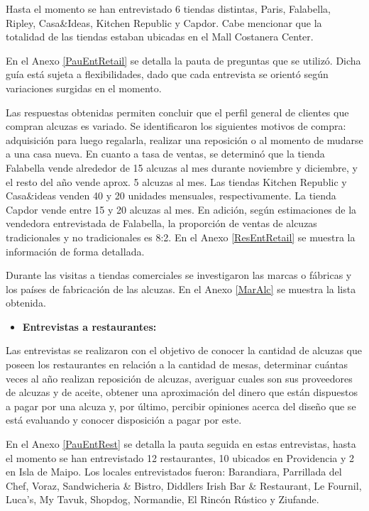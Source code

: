 Hasta el momento se han entrevistado 6 tiendas distintas, Paris, Falabella, Ripley, Casa\&Ideas, Kitchen Republic y Capdor. Cabe mencionar que la totalidad de las tiendas estaban ubicadas en el Mall Costanera Center.

En el Anexo \ref{PauEntRetail} se detalla la pauta de preguntas que se utilizó. Dicha guía está sujeta a flexibilidades, dado que cada entrevista se orientó según variaciones surgidas en el momento.

Las respuestas obtenidas permiten concluir que el perfil general de clientes que compran alcuzas es variado. Se identificaron los siguientes motivos de compra: adquisición para luego regalarla, realizar una reposición o al momento de mudarse a una casa nueva. En cuanto a tasa de ventas, se determinó que la tienda Falabella vende alrededor de 15 alcuzas al mes durante noviembre y diciembre, y el resto del año vende aprox. 5 alcuzas al mes. Las tiendas Kitchen Republic y Casa\&ideas venden 40 y 20 unidades mensuales, respectivamente.  La tienda Capdor vende entre 15 y 20 alcuzas al mes. En adición, según estimaciones de la vendedora entrevistada de Falabella, la proporción de ventas de alcuzas tradicionales y no tradicionales es 8:2. En el Anexo \ref{ResEntRetail} se muestra la información de forma detallada.

Durante las visitas a tiendas comerciales se investigaron las marcas o fábricas y los países de fabricación de las alcuzas. En el Anexo \ref{MarAlc} se muestra la lista obtenida.

\begin{itemize}
\item \textbf{Entrevistas a restaurantes:}
\end{itemize}

Las entrevistas se realizaron con el objetivo de conocer la cantidad de alcuzas que poseen los restaurantes en relación a la cantidad de mesas, determinar cuántas veces al año realizan reposición de alcuzas, averiguar cuales son sus proveedores de alcuzas y de aceite, obtener una aproximación del dinero que están dispuestos a pagar por una alcuza y, por último, percibir opiniones acerca del diseño que se está evaluando y conocer disposición a pagar por este.

En el Anexo \ref{PauEntRest} se detalla la pauta seguida en estas entrevistas, hasta el momento se han entrevistado 12 restaurantes, 10 ubicados en Providencia y 2 en Isla de Maipo. Los locales entrevistados fueron: Barandiara, Parrillada del Chef, Voraz, Sandwicheria \& Bistro, Diddlers Irish Bar \& Restaurant, Le Fournil, Luca’s, My Tavuk, Shopdog, Normandie, El Rincón Rústico y Ziufande.


